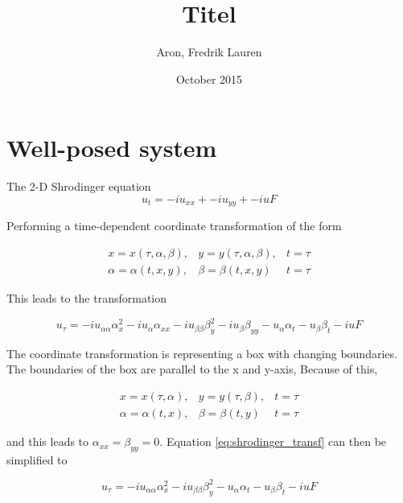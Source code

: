 \documentclass{article}
\title{Titel \\}
\author{Aron, Fredrik Lauren}
\date{October 2015}
\begin{document}
\maketitle

\section{Well-posed system}
The 2-D Shrodinger equation 
\begin{equation}\label{eq:schrodinger}
u_t = -iu_{xx} + -iu_{yy} + -iuF
\end{equation}

Performing a time-dependent coordinate transformation of the form

\begin{equation}
\begin{array}{ccc}
 x = x(\tau,\alpha,\beta), & y = y(\tau,\alpha,\beta), & t = \tau \\
 \alpha = \alpha(t,x,y), & \beta = \beta(t,x,y) & t = \tau
\end{array}
\end{equation}

This leads to the transformation

\begin{equation}\label{eq:shrodinger_transf}
u_\tau = -iu_{\alpha \alpha} \alpha^2_x -iu_\alpha \alpha_{xx} - iu_{\beta \beta} \beta^2_y -iu_\beta \beta_{yy} - u_\alpha \alpha_t - u_\beta \beta_t - iuF
\end{equation}

The coordinate transformation is representing a box with changing boundaries. The boundaries of the box are parallel to the x and y-axis, Because of this, 

\begin{equation}
\begin{array}{ccc}
 x = x(\tau,\alpha), & y = y(\tau,\beta), & t = \tau \\
 \alpha = \alpha(t,x), & \beta = \beta(t,y) & t = \tau
\end{array}
\end{equation}

and this leads to $\alpha_{xx} = \beta_{yy} = 0$. Equation \eqref{eq:shrodinger_transf} can then be simplified to 

\begin{equation}\label{eq:shrodinger_transf_2}
u_\tau = -iu_{\alpha \alpha} \alpha^2_x  - iu_{\beta \beta} \beta^2_y - u_\alpha \alpha_t - u_\beta \beta_t - iuF
\end{equation}
\end{document}
